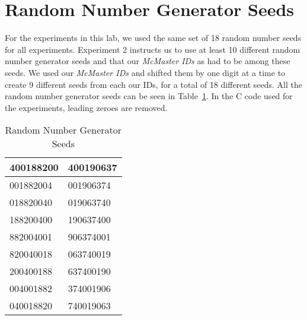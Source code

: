 \section*{Random Number Generator Seeds}
For the experiments in this lab, we used the same set of 18 random number seeds for all experiments. Experiment 2 instructs us to use at least 10 different random number generator seeds and that our \textit{McMaster IDs} as had to be among these seeds. We used our \textit{McMaster IDs} and shifted them by one digit at a time to create 9 different seeds from each our IDs, for a total of 18 different seeds. All the random number generator seeds can be seen in Table~\ref{tab:random_seeds}. In the C code used for the experiments, leading zeroes are removed.

\begin{table}[h]
	\centering
	\begin{tabular}{|l|l|}
	\hline
	400188200 & 400190637 \\ \hline
	001882004 & 001906374 \\ \hline
	018820040 & 019063740 \\ \hline
	188200400 & 190637400 \\ \hline
	882004001 & 906374001 \\ \hline
	820040018 & 063740019 \\ \hline
	200400188 & 637400190 \\ \hline
	004001882 & 374001906 \\ \hline
	040018820 & 740019063 \\ \hline
	\end{tabular}
\caption{Random Number Generator Seeds}
\label{tab:random_seeds}
\end{table}